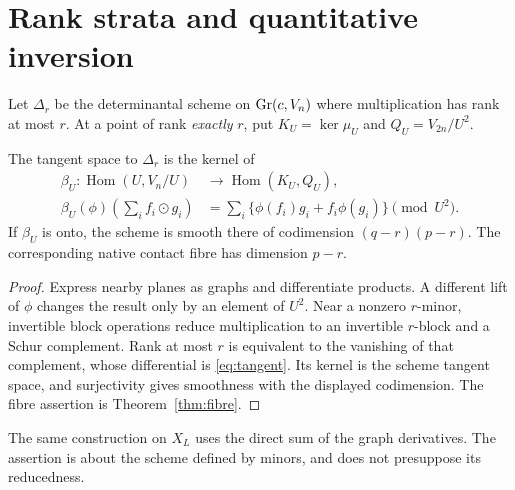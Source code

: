 \section{Rank strata and quantitative inversion}\label{sec:stability}
Let $\Delta_r$ be the determinantal scheme on $\operatorname{Gr}(c,V_n)$ where multiplication has rank at most $r$. At a point of rank \emph{exactly} $r$, put $K_U=\ker\mu_U$ and $Q_U=V_{2n}/U^2$.
\begin{proposition}\label{prop:tangent}
The tangent space to $\Delta_r$ is the kernel of
\begin{equation}\label{eq:tangent}
 \begin{split}
 \beta_U:\operatorname{Hom}(U,V_n/U)&\longrightarrow\operatorname{Hom}(K_U,Q_U),\\
 \beta_U(\phi)\left(\sum_i f_i\odot g_i\right)
    &=\sum_i\{\phi(f_i)g_i+f_i\phi(g_i)\}\pmod{U^2}.
 \end{split}
\end{equation}
If $\beta_U$ is onto, the scheme is smooth there of codimension $(q-r)(p-r)$. The corresponding native contact fibre has dimension $p-r$.
\end{proposition}
\begin{proof}
Express nearby planes as graphs and differentiate products. A different lift of $\phi$ changes the result only by an element of $U^2$. Near a nonzero $r$-minor, invertible block operations reduce multiplication to an invertible $r$-block and a Schur complement. Rank at most $r$ is equivalent to the vanishing of that complement, whose differential is \eqref{eq:tangent}. Its kernel is the scheme tangent space, and surjectivity gives smoothness with the displayed codimension. The fibre assertion is Theorem~\ref{thm:fibre}.
\end{proof}
The same construction on $X_L$ uses the direct sum of the graph derivatives. The assertion is about the scheme defined by minors, and does not presuppose its reducedness.

